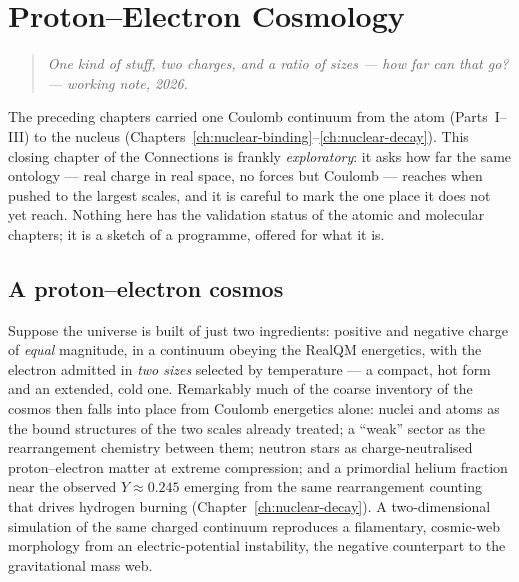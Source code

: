 \chapter{Proton--Electron Cosmology}\label{ch:cosmology}

\begin{quote}
\itshape One kind of stuff, two charges, and a ratio of sizes --- how far can that go?\\
\normalfont\hfill --- working note, 2026.
\end{quote}
\bigskip

The preceding chapters carried one Coulomb continuum from the atom (Parts~I--III) to the nucleus
(Chapters~\ref{ch:nuclear-binding}--\ref{ch:nuclear-decay}). This closing chapter of the Connections is
frankly \emph{exploratory}: it asks how far the same ontology --- real charge in real space, no forces but
Coulomb --- reaches when pushed to the largest scales, and it is careful to mark the one place it does not yet
reach. Nothing here has the validation status of the atomic and molecular chapters; it is a sketch of a
programme, offered for what it is.

\section{A proton--electron cosmos}\label{sec:pe-cosmos}

Suppose the universe is built of just two ingredients: positive and negative charge of \emph{equal} magnitude,
in a continuum obeying the RealQM energetics, with the electron admitted in \emph{two sizes} selected by
temperature --- a compact, hot form and an extended, cold one. Remarkably much of the coarse inventory of the
cosmos then falls into place from Coulomb energetics alone: nuclei and atoms as the bound structures of the two
scales already treated; a ``weak'' sector as the rearrangement chemistry between them; neutron stars as
charge-neutralised proton--electron matter at extreme compression; and a primordial helium fraction near the
observed $Y\approx 0.245$ emerging from the same rearrangement counting that drives hydrogen burning
(Chapter~\ref{ch:nuclear-decay}). A two-dimensional simulation of the same charged continuum reproduces a
filamentary, cosmic-web morphology from an electric-potential instability, the negative counterpart to the
gravitational mass web.

